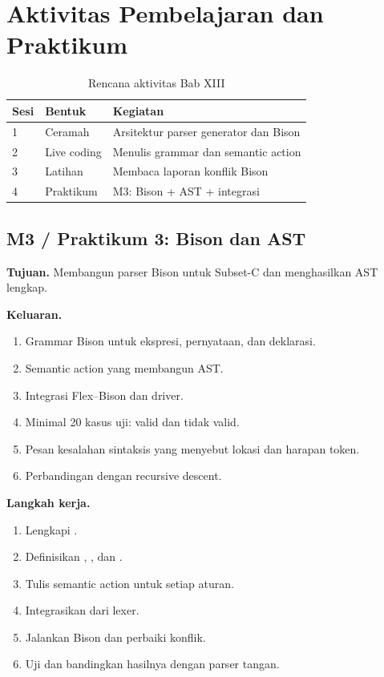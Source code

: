 \section*{Aktivitas Pembelajaran dan Praktikum}

\begin{table}[H]
\centering
\caption{Rencana aktivitas Bab XIII}
\label{tab:ch13-aktivitas}
\begin{tabularx}{\textwidth}{@{}llX@{}}
\toprule
\textbf{Sesi} & \textbf{Bentuk} & \textbf{Kegiatan} \\
\midrule
1 & Ceramah & Arsitektur parser generator dan Bison \\
2 & Live coding & Menulis grammar dan semantic action \\
3 & Latihan & Membaca laporan konflik Bison \\
4 & Praktikum & M3: Bison + AST + integrasi \\
\bottomrule
\end{tabularx}
\end{table}

\subsection*{M3 / Praktikum 3: Bison dan AST}
\textbf{Tujuan.} Membangun parser Bison untuk Subset-C dan
menghasilkan AST lengkap.

\textbf{Keluaran.}
\begin{enumerate}[label=\arabic*.,leftmargin=*]
  \item Grammar Bison untuk ekspresi, pernyataan, dan deklarasi.
  \item Semantic action yang membangun AST.
  \item Integrasi Flex--Bison dan driver.
  \item Minimal 20 kasus uji: valid dan tidak valid.
  \item Pesan kesalahan sintaksis yang menyebut lokasi dan harapan
        token.
  \item Perbandingan dengan recursive descent.
\end{enumerate}

\textbf{Langkah kerja.}
\begin{enumerate}[label=\arabic*.,leftmargin=*]
  \item Lengkapi .
  \item Definisikan , , dan .
  \item Tulis semantic action untuk setiap aturan.
  \item Integrasikan  dari lexer.
  \item Jalankan Bison dan perbaiki konflik.
  \item Uji dan bandingkan hasilnya dengan parser tangan.
\end{enumerate}

